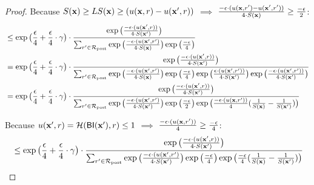 \documentclass{article}
\begin{document}
\begin{proof}
  Because $S(\textbf{x}) \geq LS(\textbf{x}) \geq (u(\textbf{x}, {r}) - u(\textbf{x}', {r}))$ $\implies$ $ \frac{-\epsilon\cdot(u(\textbf{x}, {r'}) - u(\textbf{x}', {r'}))}{4 \cdot S(\textbf{x})} \geq \frac{-\epsilon}{2}$:
  \begin{equation*}
  \begin{split}
  & \leq \exp\big( \frac{\epsilon}{4} + \frac{\epsilon}{4} \cdot \gamma\big) \cdot 
  \frac {
  \exp
  \big(
  \frac{-\epsilon\cdot(u(\textbf{x}', {r}))}{4\cdot S(\textbf{x}')}
  \big)
  } 
  {
  \sum_{r'\in \mathcal{R}_{\textup{post}}} 
  \exp 
  \big(
  \frac{-\epsilon\cdot(u(\textbf{x}', {r'})}{4 \cdot S(\textbf{x})}
  \big)
  \exp 
  \big(
  \frac{-\epsilon}{4}
  \big)
  }\\
  & = \exp\big( \frac{\epsilon}{4} + \frac{\epsilon}{4} \cdot \gamma\big) \cdot 
  \frac {
  \exp
  \big(
  \frac{-\epsilon\cdot(u(\textbf{x}', {r}))}{4\cdot S(\textbf{x}')}
  \big)
  } 
  {
  \sum_{r'\in \mathcal{R}_{\textup{post}}} 
  \exp 
  \big(
  \frac{-\epsilon\cdot(u(\textbf{x}', {r'})}{4 \cdot S(\textbf{x})}
  \big)
  \exp 
  \big(
  \frac{-\epsilon}{4}
  \big)
  \exp
  \big(
  \frac{\epsilon\cdot(u(\textbf{x}', {r'}))}{4\cdot S(\textbf{x}')}
  \big)
  \exp
  \big(
  \frac{-\epsilon\cdot(u(\textbf{x}', {r'}))}{4\cdot S(\textbf{x}')}
  \big)
  }\\
  & = \exp\big( \frac{\epsilon}{4} + \frac{\epsilon}{4} \cdot \gamma\big) \cdot 
  \frac {
  \exp
  \big(
  \frac{-\epsilon\cdot(u(\textbf{x}', {r}))}{4\cdot S(\textbf{x}')}
  \big)
  } 
  {
  \sum_{r'\in \mathcal{R}_{\textup{post}}} 
  \exp 
  \big(
  \frac{-\epsilon\cdot(u(\textbf{x}', {r'})}{4 \cdot S(\textbf{x}')}
  \big)
  \exp 
  \big(
  \frac{-\epsilon}{2}
  \big)
  \exp
  \big(
  \frac{- \epsilon\cdot(u(\textbf{x}, {r'}))}{4}
  (\frac{1}{S(\textbf{x})}
-
  \frac{1}{S(\textbf{x}')})
  \big)
  }\\
  \end{split}
  \end{equation*}

  Because $u(\textbf{x}', {r}) = \mathcal{H}(\mathsf{BI}(\textbf{x}'), r) \leq 1$ $\implies$ $\frac{- \epsilon\cdot(u(\textbf{x}, {r'}))}{4} \geq  \frac{-\epsilon}{4}$:
  \begin{equation*}
  \begin{split}
  & \leq \exp\big( \frac{\epsilon}{4} + \frac{\epsilon}{4} \cdot \gamma\big) \cdot 
  \frac {
  \exp
  \big(
  \frac{-\epsilon\cdot(u(\textbf{x}', {r}))}{4\cdot S(\textbf{x}')}
  \big)
  } 
  {
  \sum_{r'\in \mathcal{R}_{\textup{post}}} 
  \exp 
  \big(
  \frac{-\epsilon\cdot(u(\textbf{x}', {r'})}{4 \cdot S(\textbf{x}')}
  \big)
  \exp 
  \big(
  \frac{-\epsilon}{4}
  \big)
  \exp
  \big(
  \frac{- \epsilon}{4}
  (\frac{1}{S(\textbf{x})}
-
  \frac{1}{S(\textbf{x}')})
  \big)
  }\\
  \end{split}
  \end{equation*}


\end{proof}
\end{document}
